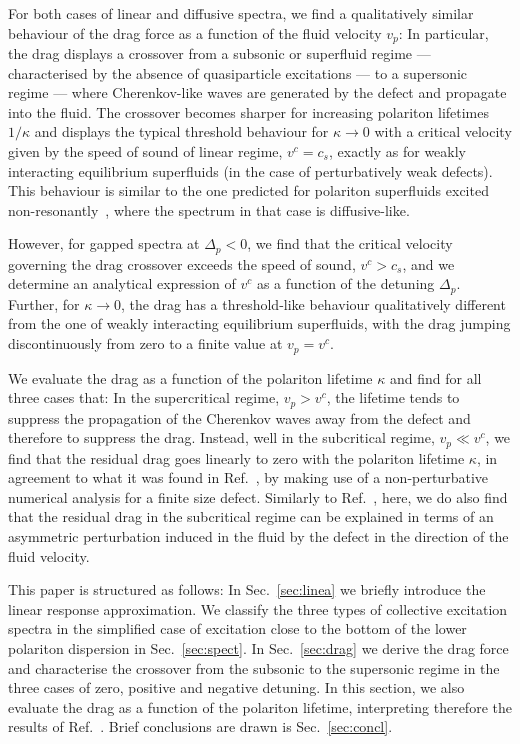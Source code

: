 For both cases of linear and diffusive spectra, we find a
qualitatively similar behaviour of the drag force as a function of the
fluid velocity $v_p$: In particular, the drag displays a crossover
from a subsonic or superfluid regime --- characterised by the absence
of quasiparticle excitations --- to a supersonic regime --- where
Cherenkov-like waves are generated by the defect and propagate into
the fluid. The crossover becomes sharper for increasing polariton
lifetimes $1/\kappa$ and displays the typical threshold behaviour for
$\kappa \to 0$ with a critical velocity given by the speed of sound of
linear regime, $v^c= c_s$, exactly as for weakly interacting
equilibrium superfluids (in the case of perturbatively weak
defects). This behaviour is similar to the one predicted for polariton
superfluids excited non-resonantly~\cite{Wouters_2010}, where the
spectrum in that case is diffusive-like.

However, for gapped spectra at $\Delta_p <0$, we find that the
critical velocity governing the drag crossover exceeds the speed of
sound, $v^c > c_s$, and we determine an analytical expression of $v^c$
as a function of the detuning $\Delta_p$. Further, for $\kappa \to 0$,
the drag has a threshold-like behaviour qualitatively different from
the one of weakly interacting equilibrium superfluids, with the drag
jumping discontinuously from zero to a finite value at $v_p=v^c$.

We evaluate the drag as a function of the polariton lifetime $\kappa$
and find for all three cases that: In the supercritical regime,
$v_p>v^c$, the lifetime tends to suppress the propagation of the
Cherenkov waves away from the defect and therefore to suppress the
drag. Instead, well in the subcritical regime, $v_p \ll v^c$, we find
that the residual drag goes linearly to zero with the polariton
lifetime $\kappa$, in agreement to what it was found in
Ref.~\cite{Cancellieri_2010}, by making use of a non-perturbative
numerical analysis for a finite size defect. Similarly to
Ref.~\cite{Cancellieri_2010}, here, we do also find that the residual
drag in the subcritical regime can be explained in terms of an
asymmetric perturbation induced in the fluid by the defect in the
direction of the fluid velocity.

This paper is structured as follows: In Sec.~\ref{sec:linea} we
briefly introduce the linear response approximation. We classify the
three types of collective excitation spectra in the simplified case of
excitation close to the bottom of the lower polariton dispersion in
Sec.~\ref{sec:spect}. In Sec.~\ref{sec:drag} we derive the drag force
and characterise the crossover from the subsonic to the supersonic
regime in the three cases of zero, positive and negative detuning. In
this section, we also evaluate the drag as a function of the polariton
lifetime, interpreting therefore the results of
Ref.~\cite{Cancellieri_2010}.  Brief conclusions are drawn is
Sec.~\ref{sec:concl}.


